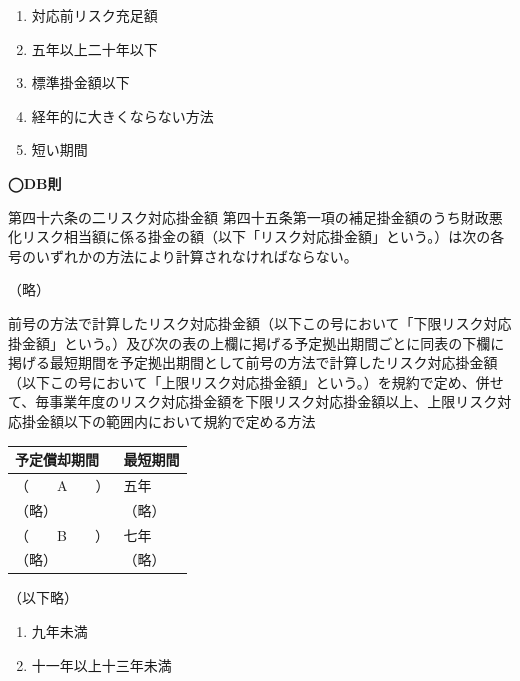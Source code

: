 \begin{answerbox}
  \begin{enumerate}[A: ]
    \item 対応前リスク充足額
    \item 五年以上二十年以下
    \item 標準掛金額以下
    \item 経年的に大きくならない方法
    \item 短い期間
  \end{enumerate}
\end{answerbox}

\begin{fillblank}[数理人試験 2020 問題1 設問1 A,B]
  \noindent \textbf{◯DB則}
  \begin{lawstructure}
    \begin{lawarticle}{第四十六条の二}{リスク対応掛金額}
      第四十五条第一項の補足掛金額のうち財政悪化リスク相当額に係る掛金の額（以下「リスク対応掛金額」という。）は次の各号のいずれかの方法により計算されなければならない。

      （略）

      前号の方法で計算したリスク対応掛金額（以下この号において「下限リスク対応掛金額」という。）及び次の表の上欄に掲げる予定拠出期間ごとに同表の下欄に掲げる最短期間を予定拠出期間として前号の方法で計算したリスク対応掛金額（以下この号において「上限リスク対応掛金額」という。）を規約で定め、併せて、毎事業年度のリスク対応掛金額を下限リスク対応掛金額以上、上限リスク対応掛金額以下の範囲内において規約で定める方法
      \begin{table}[htbp]
        \centering
        \begin{tabular}{|l|l|} \hline
          予定償却期間 & 最短期間 \\ \hline
          （　　A　　） & 五年 \\ \hline
          （略） & （略） \\ \hline
          （　　B　　） & 七年 \\ \hline
          （略） & （略） \\ \hline
        \end{tabular}
      \end{table}

      （以下略）
    \end{lawarticle}
  \end{lawstructure}
\end{fillblank}


\begin{answerbox}
  \begin{enumerate}[A: ]
    \item 九年未満
    \item 十一年以上十三年未満
  \end{enumerate}
\end{answerbox}

